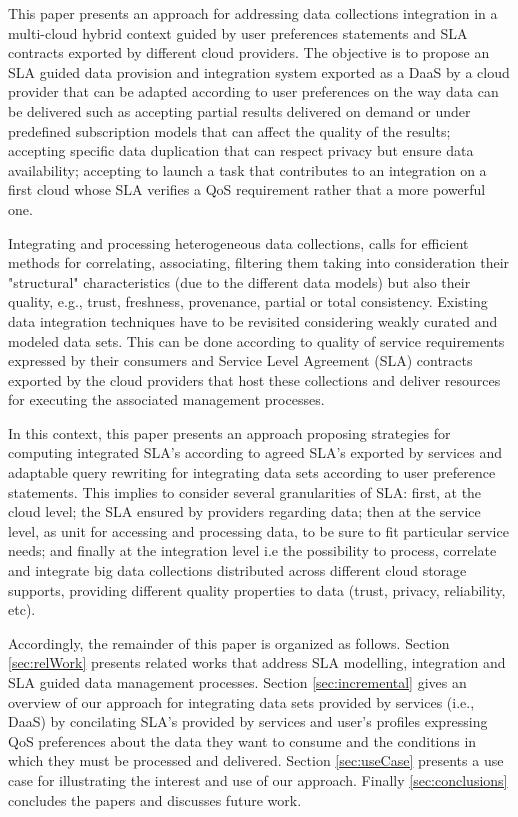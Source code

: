 This paper presents an approach for addressing  data collections integration  in a multi-cloud hybrid context guided by user preferences statements and SLA contracts exported by different cloud providers. The objective is to propose an SLA guided  data provision and integration system exported as a DaaS by a cloud provider that can be adapted according to user preferences on the way data can be delivered  such as accepting partial results delivered on demand or under predefined subscription models that can affect the quality of the results; accepting specific data duplication that can respect privacy but ensure data availability; accepting to launch a task that contributes to an integration on a first cloud whose SLA verifies a QoS requirement rather that a more powerful one.  

Integrating and processing heterogeneous data collections, calls for efficient methods for correlating, associating, filtering them taking into consideration their "structural" characteristics (due to the different data models) but also their quality, e.g., trust, freshness, provenance, partial or total consistency. 
Existing data integration techniques have to be revisited considering weakly curated and modeled data sets. This can be done according to quality of service requirements expressed by their consumers and Service Level Agreement (SLA) contracts exported by the cloud providers that host  these collections and deliver resources for executing the associated management processes.


In this context, this paper presents an approach proposing strategies for computing integrated SLA's according to agreed SLA's exported by services  and adaptable query rewriting for integrating data sets  according to user preference statements.
This implies to consider several granularities of SLA: first, at the cloud level; the SLA ensured by providers regarding data; then at the service level, as unit for accessing and processing data, to be sure to fit particular service needs; and finally at the integration level i.e the possibility to process, correlate and integrate big data collections distributed across different cloud storage supports, providing different quality properties to data (trust, privacy, reliability, etc).
 
 
Accordingly, the remainder of this paper is organized as follows. Section \ref{sec:relWork} presents related works that address SLA modelling, integration and SLA guided data management processes. Section \ref{sec:incremental} gives an overview of our approach for integrating data sets provided by services (i.e., DaaS) by concilating SLA's provided by services and user's profiles expressing QoS preferences about the data they want to consume and the conditions in which they must be processed and delivered. 
Section \ref{sec:useCase} presents a use case for illustrating the interest and use of our approach. 
Finally \ref{sec:conclusions} concludes the papers and discusses future work.